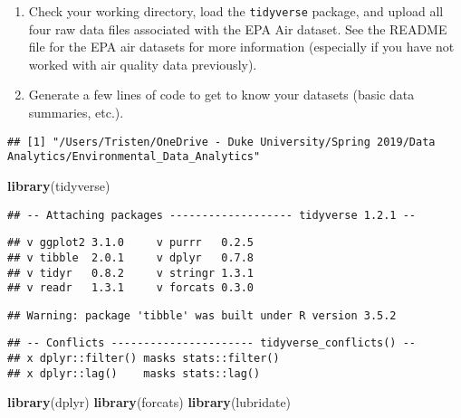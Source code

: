 \documentclass[]{article}
\newenvironment{Shaded}{\begin{snugshade}}{\end{snugshade}}
\newcommand{\KeywordTok}[1]{\textcolor[rgb]{0.13,0.29,0.53}{\textbf{#1}}}
\newcommand{\CommentTok}[1]{\textcolor[rgb]{0.56,0.35,0.01}{\textit{#1}}}
\newcommand{\NormalTok}[1]{#1}
\begin{document}
\begin{enumerate}
\def\labelenumi{\arabic{enumi}.}
\item
  Check your working directory, load the \texttt{tidyverse} package, and
  upload all four raw data files associated with the EPA Air dataset.
  See the README file for the EPA air datasets for more information
  (especially if you have not worked with air quality data previously).
\item
  Generate a few lines of code to get to know your datasets (basic data
  summaries, etc.).
\end{enumerate}

\begin{Shaded}
\end{Shaded}

\begin{verbatim}
## [1] "/Users/Tristen/OneDrive - Duke University/Spring 2019/Data Analytics/Environmental_Data_Analytics"
\end{verbatim}

\begin{Shaded}
\begin{Highlighting}[]
\KeywordTok{library}\NormalTok{(tidyverse)}
\end{Highlighting}
\end{Shaded}

\begin{verbatim}
## -- Attaching packages ------------------- tidyverse 1.2.1 --
\end{verbatim}

\begin{verbatim}
## v ggplot2 3.1.0     v purrr   0.2.5
## v tibble  2.0.1     v dplyr   0.7.8
## v tidyr   0.8.2     v stringr 1.3.1
## v readr   1.3.1     v forcats 0.3.0
\end{verbatim}

\begin{verbatim}
## Warning: package 'tibble' was built under R version 3.5.2
\end{verbatim}

\begin{verbatim}
## -- Conflicts ---------------------- tidyverse_conflicts() --
## x dplyr::filter() masks stats::filter()
## x dplyr::lag()    masks stats::lag()
\end{verbatim}

\begin{Shaded}
\begin{Highlighting}[]
\KeywordTok{library}\NormalTok{(dplyr)}
\KeywordTok{library}\NormalTok{(forcats)}
\KeywordTok{library}\NormalTok{(lubridate)}
\end{Highlighting}
\end{Shaded}
\end{document}
